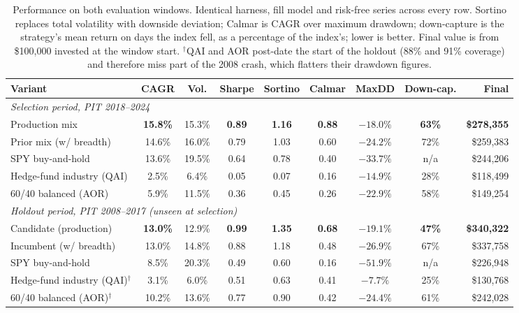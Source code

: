 \documentclass[10pt,twocolumn]{IEEEtran}
\begin{document}
\begin{table}[t]
\caption{Performance on both evaluation windows. Identical harness, fill model
and risk-free series across every row. Sortino replaces total volatility with
downside deviation; Calmar is CAGR over maximum drawdown; down-capture is the
strategy's mean return on days the index fell, as a percentage of the index's;
lower is better. Final value is from \$100{,}000 invested at the window
start. $^\dagger$QAI and AOR post-date the start of the holdout (88\% and 91\%
coverage) and therefore miss part of the 2008 crash, which flatters their
drawdown figures.}
\label{tab:perf}
\centering
\begin{tabular}{lcccccccr}
\toprule
Variant & CAGR & Vol. & Sharpe & Sortino & Calmar & MaxDD & Down-cap. & Final \\
\midrule
\multicolumn{9}{l}{\emph{Selection period, PIT 2018--2024}} \\
Production mix & \textbf{15.8\%} & 15.3\% & \textbf{0.89} & \textbf{1.16} & \textbf{0.88} & $\mathbf{-18.0\%}$ & \textbf{63\%} & \textbf{\$278{,}355} \\
Prior mix (w/ breadth) & 14.6\% & 16.0\% & 0.79 & 1.03 & 0.60 & $-24.2\%$ & 72\% & \$259{,}383 \\
SPY buy-and-hold & 13.6\% & 19.5\% & 0.64 & 0.78 & 0.40 & $-33.7\%$ & n/a & \$244{,}206 \\
Hedge-fund industry (QAI) & 2.5\% & 6.4\% & 0.05 & 0.07 & 0.16 & $-14.9\%$ & 28\% & \$118{,}499 \\
60/40 balanced (AOR) & 5.9\% & 11.5\% & 0.36 & 0.45 & 0.26 & $-22.9\%$ & 58\% & \$149{,}254 \\
\midrule
\multicolumn{9}{l}{\emph{Holdout period, PIT 2008--2017 (unseen at selection)}} \\
Candidate (production) & \textbf{13.0\%} & 12.9\% & \textbf{0.99} & \textbf{1.35} & \textbf{0.68} & $\mathbf{-19.1\%}$ & \textbf{47\%} & \textbf{\$340{,}322} \\
Incumbent (w/ breadth) & 13.0\% & 14.8\% & 0.88 & 1.18 & 0.48 & $-26.9\%$ & 67\% & \$337{,}758 \\
SPY buy-and-hold & 8.5\% & 20.3\% & 0.49 & 0.60 & 0.16 & $-51.9\%$ & n/a & \$226{,}948 \\
Hedge-fund industry (QAI)$^\dagger$ & 3.1\% & 6.0\% & 0.51 & 0.63 & 0.41 & $-7.7\%$ & 25\% & \$130{,}768 \\
60/40 balanced (AOR)$^\dagger$ & 10.2\% & 13.6\% & 0.77 & 0.90 & 0.42 & $-24.4\%$ & 61\% & \$242{,}028 \\
\bottomrule
\end{tabular}
\end{table}
\end{document}

